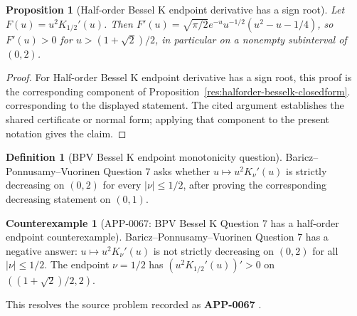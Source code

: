 \documentclass[11pt]{article}
\numberwithin{equation}{section}
\newtheorem{proposition}[theorem]{Proposition}
\theoremstyle{definition}
\newtheorem{definition}{Definition}[section]
\newtheorem{counterexample}[theorem]{Counterexample}
\theoremstyle{remark}
\newcommand{\1}{\mathbf 1}
\begin{document}
\begin{proposition}[Half-order Bessel K endpoint derivative has a sign root]
\label{res:halforder-kderivative-signroot}
Let \(F(u)=u^2K_{1/2}'(u)\). Then \(F'(u)=\sqrt{\pi/2}e^{-u}u^{-1/2}(u^2-u-1/4)\), so \(F'(u)>0\) for \(u>(1+\sqrt2)/2\), in particular on a nonempty subinterval of \((0,2)\).
\end{proposition}

\begin{proof}
For Half-order Bessel K endpoint derivative has a sign root, this proof is the corresponding component of Proposition~\ref{res:halforder-besselk-closedform}.  corresponding to the displayed statement.  The cited argument establishes the shared certificate or normal form; applying that component to the present notation gives the claim.
\end{proof}

\begin{definition}[BPV Bessel K endpoint monotonicity question]
\label{res:besselk-endpoint-monotonicity-question}
Baricz--Ponnusamy--Vuorinen Question 7 asks whether \(u\mapsto u^2K_\nu'(u)\) is strictly decreasing on \((0,2)\) for every \(|\nu|\le1/2\), after proving the corresponding decreasing statement on \((0,1)\).
\end{definition}

\begin{counterexample}[APP-0067: BPV Bessel K Question 7 has a half-order endpoint counterexample]
\label{res:besselk-question7-negative-endpoint-counterexample}
Baricz--Ponnusamy--Vuorinen Question 7 has a negative answer: \(u\mapsto u^2K_\nu'(u)\) is not strictly decreasing on \((0,2)\) for all \(|\nu|\le1/2\). The endpoint \(\nu=1/2\) has \((u^2K_{1/2}'(u))'>0\) on \(((1+\sqrt2)/2,2)\).



This resolves the source problem recorded as \textbf{APP-0067} \cite{app-app-0056-source}.
\end{counterexample}
\end{document}
